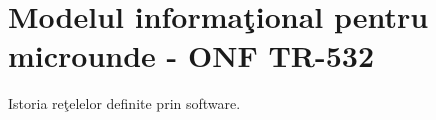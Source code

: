 \section{Modelul informaţional pentru microunde - ONF TR-532}

Istoria reţelelor definite prin software.